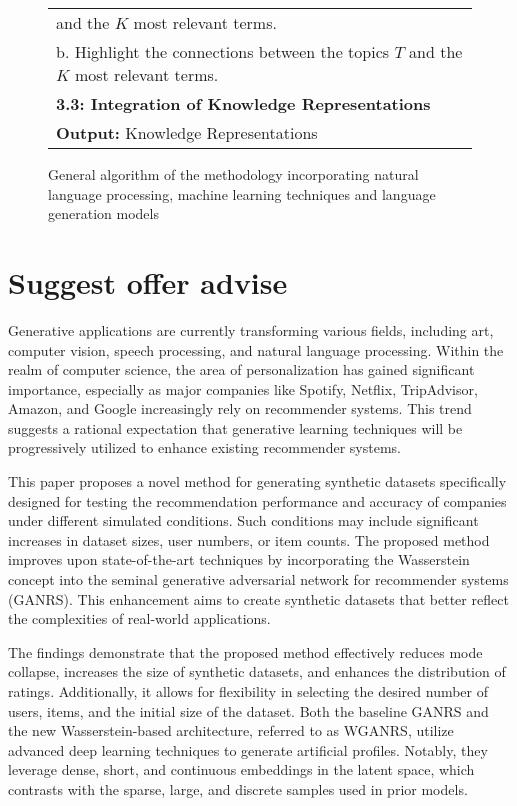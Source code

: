 \documentclass[runningheads]{llncs}
\begin{document}
\begin{figure*}[!h]
\begin{tabular}{l}
		\quad \quad and the $K$ most relevant terms.\\
		\quad \quad b. Highlight the connections between the topics $T$ and the $K$ most relevant terms.\\
		\quad \textbf{3.3: Integration of Knowledge Representations}\\
		\hline
		\textbf{Output:} Knowledge Representations \\
		\hline
	\end{tabular}
	\caption{\centering General algorithm of the methodology incorporating natural language processing, machine learning techniques and language generation models}
	\label{tab:Algorithm}
\end{figure*}


\section{Suggest offer advise}
Generative applications are currently transforming various fields, including art, computer vision, speech processing, and natural language processing. Within the realm of computer science, the area of personalization has gained significant importance, especially as major companies like Spotify, Netflix, TripAdvisor, Amazon, and Google increasingly rely on recommender systems. This trend suggests a rational expectation that generative learning techniques will be progressively utilized to enhance existing recommender systems.

This paper proposes a novel method for generating synthetic datasets specifically designed for testing the recommendation performance and accuracy of companies under different simulated conditions. Such conditions may include significant increases in dataset sizes, user numbers, or item counts. The proposed method improves upon state-of-the-art techniques by incorporating the Wasserstein concept into the seminal generative adversarial network for recommender systems (GANRS). This enhancement aims to create synthetic datasets that better reflect the complexities of real-world applications.

The findings demonstrate that the proposed method effectively reduces mode collapse, increases the size of synthetic datasets, and enhances the distribution of ratings. Additionally, it allows for flexibility in selecting the desired number of users, items, and the initial size of the dataset. Both the baseline GANRS and the new Wasserstein-based architecture, referred to as WGANRS, utilize advanced deep learning techniques to generate artificial profiles. Notably, they leverage dense, short, and continuous embeddings in the latent space, which contrasts with the sparse, large, and discrete samples used in prior models.
\end{document}
